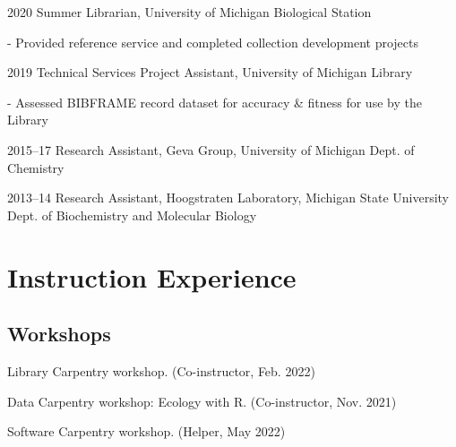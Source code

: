 \documentclass[12pt,letterpaper]{report}
\newcommand{\listitemspace}{0.25em}
\renewenvironment{itemize}
{\begin{list}{}{\setlength{\leftmargin}{0em}
            \setlength{\parskip}{0em}
            \setlength{\itemsep}{\listitemspace}
            \setlength{\parsep}{\listitemspace}}}
{\end{list}}
\begin{document}
\begin{tablist}
	\item[2020] \tab Summer Librarian, University of Michigan Biological Station

	\begin{itemize} \begin{footnotesize}

		\item - Provided reference service and completed collection development projects

	\end{footnotesize} \end{itemize}
    
	\item[2019] \tab Technical Services Project Assistant, University of Michigan Library
	
	\begin{itemize} \begin{footnotesize}
	
		\item - Assessed BIBFRAME record dataset for accuracy \& fitness for use by the Library
		
	\end{footnotesize} \end{itemize}

	\item[2015--17] \tab Research Assistant, Geva Group, University of Michigan Dept. of Chemistry
	
	\item[2013--14] \tab Research Assistant, Hoogstraten Laboratory, Michigan State University Dept. of Biochemistry and Molecular Biology

\end{tablist}



\section*{Instruction Experience}

\subsection*{Workshops}

\begin{itemize}

	\item Library Carpentry workshop. (Co-instructor, Feb. 2022)
	
	\item Data Carpentry workshop: Ecology with R. (Co-instructor, Nov. 2021)
	
	\item Software Carpentry workshop. (Helper, May 2022)

\end{itemize}
\end{document}
